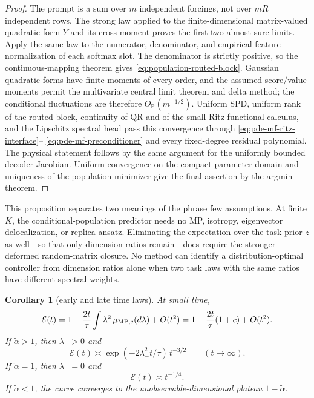 \documentclass[11pt,a4paper]{article}
\newtheorem{corollary}{Corollary}
\theoremstyle{definition}
\begin{document}
\begin{proof}
The prompt is a sum over $m$ independent forcings, not over $mR$ independent
rows.  The strong law applied to the finite-dimensional matrix-valued
quadratic form $Y$ and its cross moment proves the first two almost-sure
limits.
Apply the same law to the numerator, denominator, and empirical feature
normalization of each softmax slot.  The denominator is strictly positive,
so the continuous-mapping theorem gives
\eqref{eq:population-routed-block}.  Gaussian quadratic forms have finite
moments of every order, and the assumed score/value moments permit the
multivariate central limit theorem and delta method; the conditional
fluctuations are therefore $O_{\mathbb P}(m^{-1/2})$.
Uniform SPD, uniform rank of the routed block, continuity of QR and of the
small Ritz functional calculus, and the Lipschitz spectral head pass this
convergence through \eqref{eq:pde-mf-ritz-interface}--
\eqref{eq:pde-mf-preconditioner} and every fixed-degree residual polynomial.
The physical statement follows by the same argument for the uniformly bounded
decoder Jacobian.  Uniform convergence on the compact parameter domain and
uniqueness of the population minimizer give the final assertion by the argmin
theorem.
\end{proof}

This proposition separates two meanings of the phrase few assumptions.  At
finite $K$, the conditional-population predictor needs no MP, isotropy,
eigenvector delocalization, or replica ansatz.  Eliminating the expectation
over the task prior $z$ as well---so that only dimension ratios
remain---does require the stronger deformed random-matrix closure.  No method
can identify a distribution-optimal controller from dimension ratios alone
when two task laws with the same ratios have different spectral weights.

\begin{corollary}[early and late time laws]
\label{cor:earlylate}
At small time,
\[
    \mathcal E(t)
    =
    1-\frac{2t}{\tau}\int\lambda^2\,\mu_{\rm MP,c}(d\lambda)
    +O(t^2)
    =
    1-\frac{2t}{\tau}(1+c)+O(t^2).
\]
If $\widetilde\alpha>1$, then $\lambda_->0$ and
\[
    \mathcal E(t)
    \asymp
    \exp(-2\lambda_-^2t/\tau)\,t^{-3/2}
    \qquad
    (t\to\infty).
\]
If $\widetilde\alpha=1$, then $\lambda_-=0$ and
\[
    \mathcal E(t)\asymp t^{-1/4}.
\]
If $\widetilde\alpha<1$, the curve converges to the unobservable-dimensional
plateau $1-\widetilde\alpha$.
\end{corollary}
\end{document}
